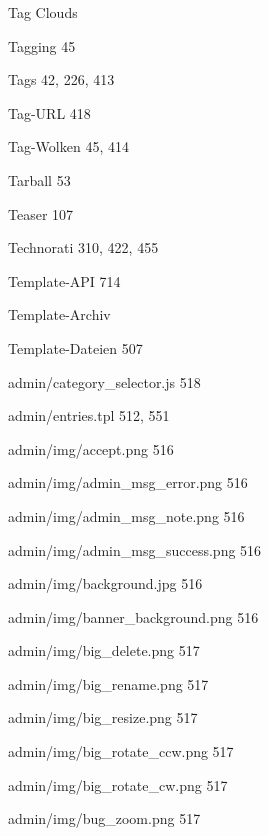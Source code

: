 \documentclass{book}
\renewcommand\subitem{\par}
\begin{document}
\begin{multicols}{2}
\begin{osp-index}
  \item Tag Clouds\hspace{1mm} 
  \item Tagging\hspace{1mm} 45
  \item Tags\hspace{1mm} 42, 226, 413
  \item Tag-URL\hspace{1mm} 418
  \item Tag-Wolken\hspace{1mm} 45, 414
  \item Tarball\hspace{1mm} 53
  \item Teaser\hspace{1mm} 107
  \item Technorati\hspace{1mm} 310, 422, 455
  \item Template-API\hspace{1mm} 714
  \item Template-Archiv\hspace{1mm} 
  \item Template-Dateien\hspace{1mm} 507
    \subitem admin/category\_selector.js\hspace{1mm} 518
    \subitem admin/entries.tpl\hspace{1mm} 512, 551
    \subitem admin/img/accept.png\hspace{1mm} 516
    \subitem admin/img/admin\_msg\_error.png\hspace{1mm} 516
    \subitem admin/img/admin\_msg\_note.png\hspace{1mm} 516
    \subitem admin/img/admin\_msg\_success.png\hspace{1mm} 516
    \subitem admin/img/background.jpg\hspace{1mm} 516
    \subitem admin/img/banner\_background.png\hspace{1mm} 516
    \subitem admin/img/big\_delete.png\hspace{1mm} 517
    \subitem admin/img/big\_rename.png\hspace{1mm} 517
    \subitem admin/img/big\_resize.png\hspace{1mm} 517
    \subitem admin/img/big\_rotate\_ccw.png\hspace{1mm} 517
    \subitem admin/img/big\_rotate\_cw.png\hspace{1mm} 517
    \subitem admin/img/bug\_zoom.png\hspace{1mm} 517

\end{osp-index}
\end{multicols}
\end{document}
